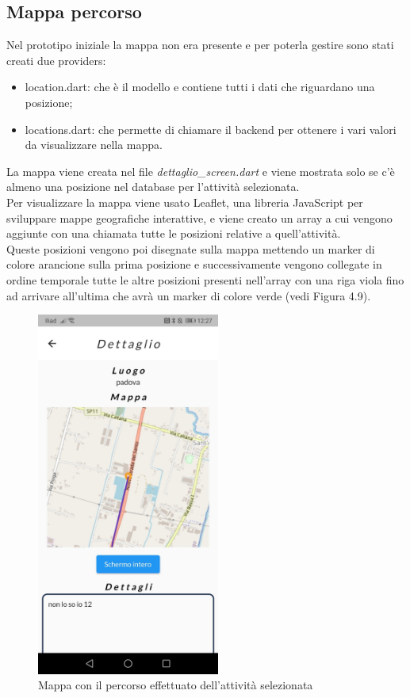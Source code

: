 \subsection{Mappa percorso}
Nel prototipo iniziale la mappa non era presente e per poterla gestire sono stati creati due providers:
\begin{itemize}
	\item location.dart: che è il modello e contiene tutti i dati che riguardano una posizione;
	\item locations.dart: che permette di chiamare il backend per ottenere i vari valori da visualizzare nella mappa.
\end{itemize}
La mappa viene creata nel file \textit{dettaglio\_screen.dart} e viene mostrata solo se c'è almeno una posizione nel database per l'attività selezionata.\\
Per visualizzare la mappa viene usato Leaflet, una libreria JavaScript per sviluppare mappe geografiche interattive, e viene creato un array a cui vengono aggiunte con una chiamata tutte le posizioni relative a quell'attività.\\ 
Queste posizioni vengono poi disegnate sulla mappa mettendo un marker di colore arancione sulla prima posizione e successivamente vengono collegate in ordine temporale tutte le altre posizioni presenti nell'array con una riga viola fino ad arrivare all'ultima che avrà un marker di colore verde (vedi Figura 4.9).\\

\begin{figure}[htbp]	
	\centering
	\includegraphics[width=6cm]{immagini/mappa.jpeg}
	\caption{Mappa con il percorso effettuato dell'attività selezionata}
	\label{fig:Mappa percorso}
\end{figure}

